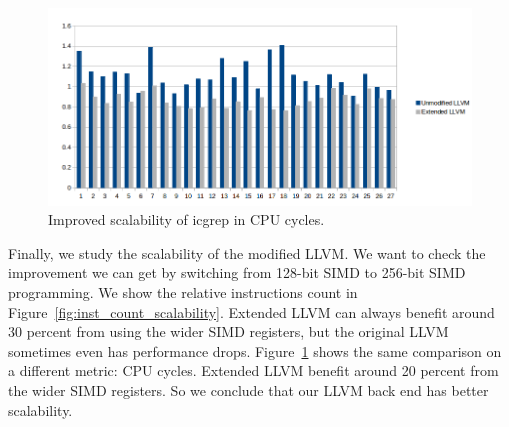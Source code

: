 \begin{figure}[htbp!]
\centering
\includegraphics[width=140mm]{draw/cpu_cycles_scalability.png}
\caption[Improved scalability of icgrep in CPU cycles]{Improved scalability of icgrep in CPU cycles.}
\label{fig:cpu_cycles_scalability}
\end{figure}

Finally, we study the scalability of the modified LLVM\@. We want to check the improvement we can get by switching from 128-bit SIMD to 256-bit SIMD programming. We show the relative instructions count in Figure~\ref{fig:inst_count_scalability}. Extended LLVM can always benefit around 30 percent from using the wider SIMD registers, but the original LLVM sometimes even has performance drops. Figure~\ref{fig:cpu_cycles_scalability} shows the same comparison on a different metric: CPU cycles. Extended LLVM benefit around 20 percent from the wider SIMD registers. So we conclude that our LLVM back end has better scalability.
